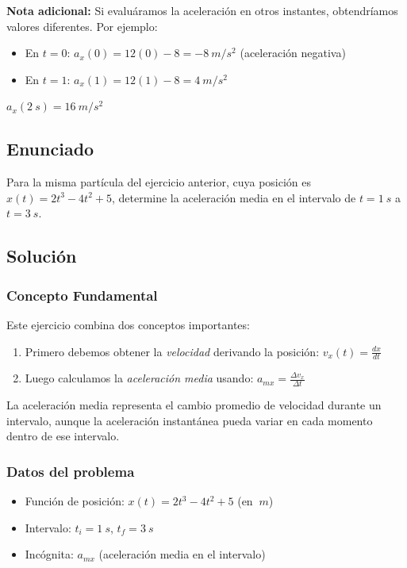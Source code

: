\documentclass[12pt, a4paper]{article}
\begin{document}
\textbf{Nota adicional:} Si evaluáramos la aceleración en otros instantes, obtendríamos valores diferentes. Por ejemplo:
\begin{itemize}
    \item En $t = 0$: $a_x(0) = 12(0) - 8 = -\SI{8}{m/s^2}$ (aceleración negativa)
    \item En $t = 1$: $a_x(1) = 12(1) - 8 = \SI{4}{m/s^2}$
\end{itemize}

\begin{tcolorbox}[colback=blue!5!white, colframe=blue!75!black, title=Respuesta Final]
\centering
\Large $\boxed{a_x(\SI{2}{s}) = \SI{16}{m/s^2}}$
\end{tcolorbox}

\newpage

\subsection*{Enunciado}
Para la misma partícula del ejercicio anterior, cuya posición es $x(t) = 2t^3 - 4t^2 + 5$, determine la aceleración media en el intervalo de $t = \SI{1}{s}$ a $t = \SI{3}{s}$.

\subsection*{Solución}

\subsubsection*{Concepto Fundamental}
Este ejercicio combina dos conceptos importantes:
\begin{enumerate}
    \item Primero debemos obtener la \textit{velocidad} derivando la posición: $v_x(t) = \frac{dx}{dt}$
    \item Luego calculamos la \textit{aceleración media} usando: $a_{mx} = \frac{\Delta v_x}{\Delta t}$
\end{enumerate}

La aceleración media representa el cambio promedio de velocidad durante un intervalo, aunque la aceleración instantánea pueda variar en cada momento dentro de ese intervalo.

\subsubsection*{Datos del problema}
\begin{itemize}[leftmargin=2cm]
    \item Función de posición: $x(t) = 2t^3 - 4t^2 + 5$ (en $\SI{}{m}$)
    \item Intervalo: $t_i = \SI{1}{s}$, $t_f = \SI{3}{s}$
    \item Incógnita: $a_{mx}$ (aceleración media en el intervalo)
\end{itemize}
\end{document}
